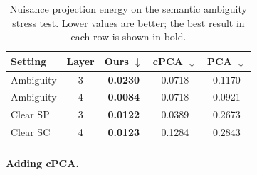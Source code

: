 \begin{table}[t]
\centering
\small
\setlength{\tabcolsep}{6pt}
\renewcommand{\arraystretch}{1.15}
\caption{Nuisance projection energy on the semantic ambiguity
stress test. Lower values are better; the best result in each
row is shown in bold.}
\label{tab:ambiguity_results}
\begin{tabular}{lcccc}
\toprule
Setting & Layer & Ours $\downarrow$ & cPCA $\downarrow$
& PCA $\downarrow$ \\
\midrule
Ambiguity & 3 & \textbf{0.0230} & 0.0718 & 0.1170 \\
Ambiguity & 4 & \textbf{0.0084} & 0.0718 & 0.0921 \\
Clear SP  & 3 & \textbf{0.0122} & 0.0389 & 0.2673 \\
Clear SC  & 4 & \textbf{0.0123} & 0.1284 & 0.2843 \\
\bottomrule
\end{tabular}
\end{table}

\paragraph{Adding cPCA.}



